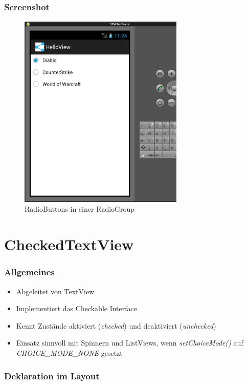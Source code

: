 \begin{frame}
   \frametitle{Screenshot}
	\begin{figure}[h!]
	  \centering
	  \includegraphics[width=0.7\textwidth]{pictures/radio_group.ps}
	  \caption{
		  RadioButtons in einer RadioGroup
	  }
	  \label{fig:radio_group}
	\end{figure}
\end{frame}

\section{CheckedTextView}
\begin{frame}
   \frametitle{Allgemeines}
   \begin{itemize}
      \item Abgeleitet von TextView
      \item Implementiert das Checkable Interface
      \item Kennt Zustände aktiviert (\emph{checked}) und deaktiviert (\emph{unchecked})
      \item Einsatz sinnvoll mit Spinnern und ListViews, wenn \emph{setChoiceMode()} 
      	auf \emph{CHOICE\_MODE\_NONE} gesetzt
   \end{itemize}
\end{frame}

\begin{frame}
   \frametitle{Deklaration im Layout}
	
\end{frame}

